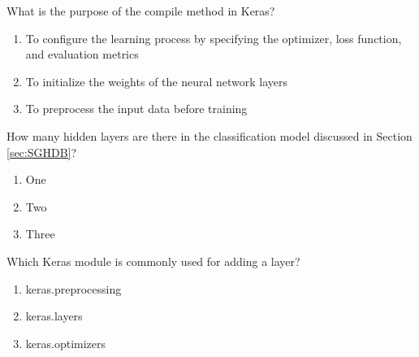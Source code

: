 \begin{question}
What is the purpose of the compile method in Keras?
\begin{enumerate}[a]
\item To configure the learning process by specifying the optimizer, loss function, and evaluation metrics
\item To initialize the weights of the neural network layers
\item To preprocess the input data before training
\end{enumerate}
\end{question}

\begin{question}
How many hidden layers are there in the classification model discussed in Section \ref{sec:SGHDB}?
\begin{enumerate}[a]
\item One
\item Two
\item Three
\end{enumerate}
\end{question}


\begin{question}
Which Keras module is commonly used for adding a layer?
\begin{enumerate}[a]
\item keras.preprocessing
\item keras.layers
\item keras.optimizers
\end{enumerate}
\end{question} 